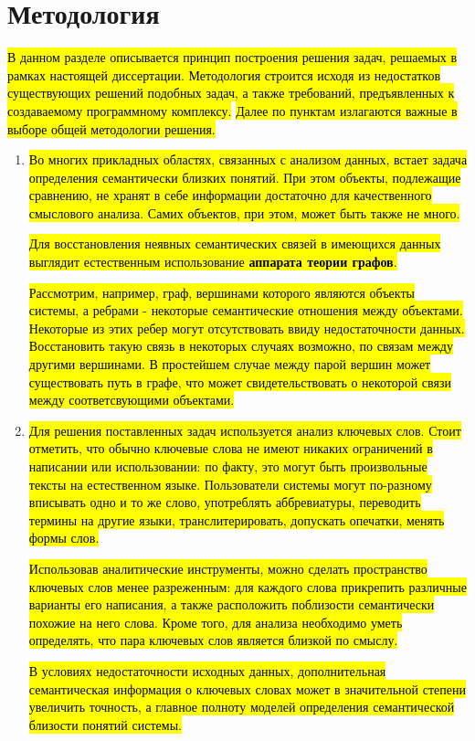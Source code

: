 \section{Методология} \label{methodology}
\hl{В данном разделе описывается принцип построения решения задач, решаемых в рамках настоящей диссертации. Методология строится исходя из недостатков существующих решений подобных задач, а также требований, предъявленных к создаваемому программному комплексу.}
\hl{Далее по пунктам излагаются важные в выборе общей методологии решения.}

\begin{enumerate}
    \item \hl{Во многих прикладных областях, связанных с анализом данных, встает задача определения семантически близких понятий. При этом объекты, подлежащие сравнению, не хранят в себе информации достаточно для качественного смыслового анализа. Самих объектов, при этом, может быть также не много.}

        \hl{Для восстановления неявных семантических связей в имеющихся данных выглядит естественным использование \textbf{аппарата теории графов}.}
    
        \hl{Рассмотрим, например, граф, вершинами которого являются объекты системы, а ребрами - некоторые семантические отношения между объектами. Некоторые из этих ребер могут отсутствовать ввиду недостаточности данных. Восстановить такую связь в некоторых случаях возможно, по связам между другими вершинами. В простейшем случае между парой вершин может существовать путь в графе, что может свидетельствовать о некоторой связи между соответсвующими объектами.}
    \item \hl{Для решения поставленных задач используется анализ ключевых слов. Стоит отметить, что обычно ключевые слова не имеют никаких ограничений в написании или использовании: по факту, это могут быть произвольные тексты на естественном языке. Пользователи системы могут по-разному вписывать одно и то же слово, употреблять аббревиатуры, переводить термины на другие языки, транслитерировать, допускать опечатки, менять формы слов.}

        \hl{Использовав аналитические инструменты, можно сделать пространство ключевых слов менее разреженным: для каждого слова прикрепить различные варианты его написания, а также расположить поблизости семантически похожие на него слова. Кроме того, для анализа необходимо уметь определять, что пара ключевых слов является близкой по смыслу.}

        \hl{В условиях недостаточности исходных данных, дополнительная семантическая информация о ключевых словах может в значительной степени увеличить точность, а главное полноту моделей определения семантической близости понятий системы. }


\end{enumerate}
